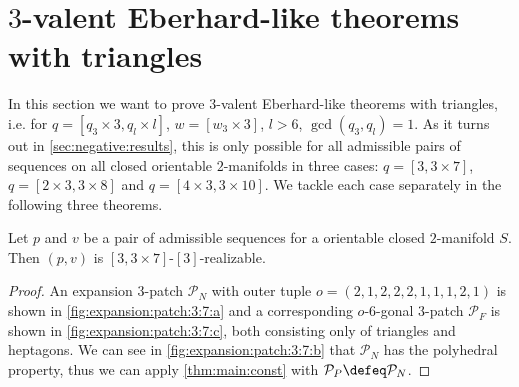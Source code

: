 \checkoddpage
\ifoddpage\hbox{}\clearpage\else\fi
{\par\vspace*{\fill}}
\section{$3$-valent {\sc Eberhard}-like theorems with triangles}\label{sec:3:3}

In this section we want to prove $3$-valent {\sc Eberhard}-like theorems with triangles, i.e. for $q = [q_3 \times 3, q_l \times l]$, $w = [w_3 \times 3]$, $l > 6$, $\gcd(q_3, q_l) = 1$. As it turns out in \autoref{sec:negative:results}, this is only possible for all admissible pairs of sequences on all closed orientable $2$-manifolds in three cases: $q = [3, 3 \times 7]$, $q = [2 \times 3, 3 \times 8]$ and $q = [4 \times 3, 3 \times 10]$. We tackle each case separately in the following three theorems.
\clearpage
\begin{theorem}
  Let $p$ and $v$ be a pair of admissible sequences for a orientable closed $2$-manifold $S$. Then $(p, v)$ is $[3, 3 \times 7]$-$[3]$-realizable.
  \begin{proof}
    An expansion $3$-patch $\mathcal{P}_N$ with outer tuple $o = (2, 1, 2, 2, 2, 1, 1, 1, 2, 1)$ is shown in \autoref{fig:expansion:patch:3:7:a} and a corresponding $o$-$6$-gonal $3$-patch $\mathcal{P}_F$ is shown in \autoref{fig:expansion:patch:3:7:c}, both consisting only of triangles and heptagons. We can see in \autoref{fig:expansion:patch:3:7:b} that $\mathcal{P}_N$ has the polyhedral property, thus we can apply \autoref{thm:main:const} with $\mathcal{P}_P \defeq \mathcal{P}_N$.
  \end{proof}
\end{theorem}
{\par\vspace*{\fill}}
